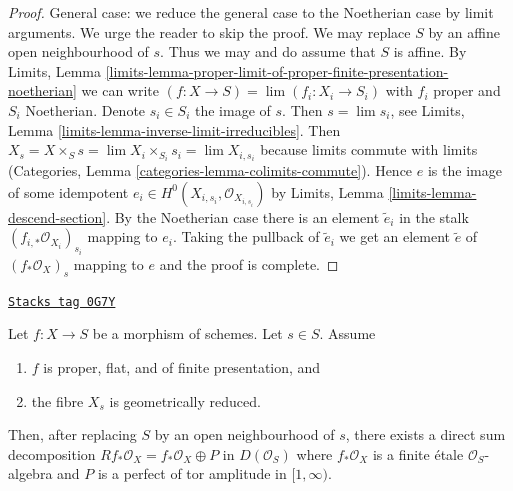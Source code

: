 \begin{proof}
\medskip\noindent
General case: we reduce the general case to the Noetherian case by
limit arguments. We urge the reader to skip the proof.
We may replace $S$ by an affine open neighbourhood of $s$.
Thus we may and do assume that $S$ is affine. By Limits, Lemma
\ref{limits-lemma-proper-limit-of-proper-finite-presentation-noetherian}
we can write $(f : X \to S) = \lim (f_i : X_i \to S_i)$ with $f_i$
proper and $S_i$ Noetherian. Denote $s_i \in S_i$ the image of $s$.
Then $s = \lim s_i$, see
Limits, Lemma \ref{limits-lemma-inverse-limit-irreducibles}.
Then $X_s = X \times_S s = \lim X_i \times_{S_i} s_i = \lim X_{i, s_i}$
because limits commute with limits
(Categories, Lemma \ref{categories-lemma-colimits-commute}).
Hence $e$ is the image of some idempotent
$e_i \in H^0(X_{i, s_i}, \mathcal{O}_{X_{i, s_i}})$
by Limits, Lemma \ref{limits-lemma-descend-section}.
By the Noetherian case there is an element $\tilde e_i$
in the stalk $(f_{i, *}\mathcal{O}_{X_i})_{s_i}$ mapping
to $e_i$. Taking the pullback of $\tilde e_i$ we get an
element $\tilde e$ of $(f_*\mathcal{O}_X)_s$ mapping
to $e$ and the proof is complete.
\end{proof}

\begin{lemma}
\label{perfect-lemma-proper-flat-geom-red}
\href{https://stacks.math.columbia.edu/tag/0G7Y}{\texttt{Stacks tag 0G7Y}}

Let $f : X \to S$ be a morphism of schemes. Let $s \in S$. Assume
\begin{enumerate}
\item $f$ is proper, flat, and of finite presentation, and
\item the fibre $X_s$ is geometrically reduced.
\end{enumerate}
Then, after replacing $S$ by an open neighbourhood of $s$, there
exists a direct sum decomposition
$Rf_*\mathcal{O}_X = f_*\mathcal{O}_X \oplus P$
in $D(\mathcal{O}_S)$ where $f_*\mathcal{O}_X$ is a finite \'etale
$\mathcal{O}_S$-algebra and
$P$ is a perfect of tor amplitude in $[1, \infty)$.
\end{lemma}

